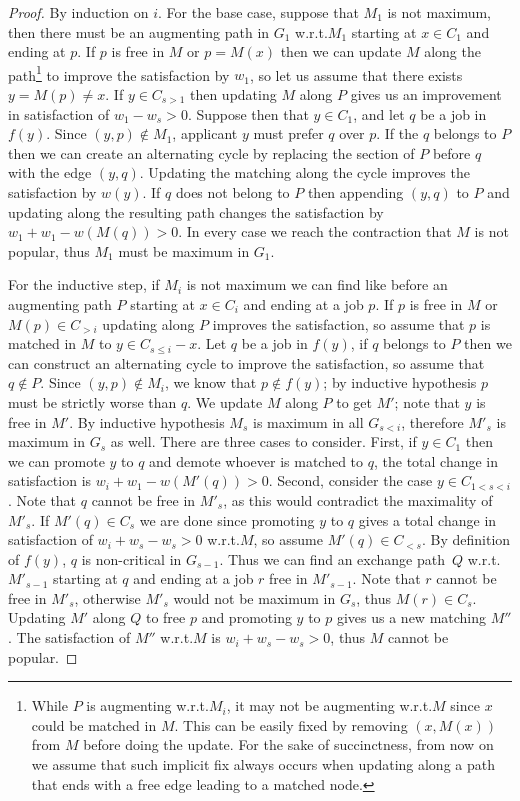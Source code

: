 \documentclass[11pt]{article}
\newcommand{\first}{f}
\newcommand{\wrt}{{w.r.t.}\xspace}
\begin{document}
\begin{proof} 
By induction on $i$. For the base case, suppose that $M_1$ is not maximum, then there must be an augmenting path in $G_1$ \wrt $M_1$ starting at $x \in C_1$ and ending at $p$. If $p$ is free in $M$ or $p = M(x)$ then we can update $M$ along the path\footnote{While $P$ is augmenting \wrt $M_i$, it may not be augmenting \wrt $M$ since $x$ could be matched in $M$. This can be easily fixed by removing $(x,M(x))$ from $M$ before doing the update. For the sake of succinctness, from now on we assume that such implicit fix always occurs when updating along a path that ends with a free edge leading to a matched node.} to improve the satisfaction by $w_1$, so let us assume that there exists $y = M(p) \neq x$. If $y \in C_{s>1}$ then updating $M$ along $P$ gives us an improvement in satisfaction of $w_1 - w_s > 0$. Suppose then that $y \in C_1$, and let $q$ be a job in $\first(y)$. Since $(y,p) \notin M_1$, applicant $y$ must prefer $q$ over $p$. If the $q$ belongs to $P$ then we can create an alternating cycle by replacing the section of $P$ before $q$ with the edge $(y,q)$. Updating the matching along the cycle improves the satisfaction by $w(y)$. If $q$ does not belong to $P$ then appending $(y,q)$ to $P$ and updating along the resulting path changes the satisfaction by $w_1+w_1 - w(M(q)) > 0$. In every case we reach the contraction that $M$ is not popular, thus $M_1$ must be maximum in $G_1$.

For the inductive step, if $M_i$ is not maximum we can find like before an augmenting path $P$ starting at $x \in C_i$ and ending at a job $p$. If $p$ is free in $M$ or $M(p) \in C_{>i}$ updating along $P$ improves the satisfaction, so assume that $p$ is matched in $M$ to $y \in C_{s \leq i} -x$. Let $q$ be a job in $\first(y)$, if $q$ belongs to $P$ then we can construct an alternating cycle to improve the satisfaction, so assume that $q \notin P$. Since $(y,p) \notin M_i$, we know that $p \notin f(y)$; by inductive hypothesis $p$ must be strictly worse than $q$. We update $M$ along $P$ to get $M'$; note that $y$ is free in $M'$. By inductive hypothesis $M_s$ is maximum in all $G_{s<i}$, therefore $M'_s$ is maximum in $G_{s}$ as well. There are three cases to consider. First, if $y \in C_1$ then we can promote $y$ to $q$ and demote whoever is matched to $q$, the total change in satisfaction is $w_i + w_1 - w(M'(q)) > 0$. Second, consider the case $y \in C_{1<s<i}$. Note that $q$ cannot be free in $M'_s$, as this would contradict the maximality of $M'_s$. If $M'(q) \in C_s$ we are done since promoting $y$ to $q$ gives a total change in satisfaction of $w_i + w_s - w_s > 0$  \wrt $M$, so assume $M'(q) \in C_{<s}$. By definition of $\first(y)$, $q$ is non-critical in $G_{s-1}$. Thus we can find an exchange path~$Q$ \wrt $M'_{s-1}$ starting at $q$ and ending at a job $r$ free in $M'_{s-1}$. Note that $r$ cannot be free in $M'_s$, otherwise $M'_s$ would not be maximum in $G_s$, thus $M(r) \in C_s$. Updating $M'$ along $Q$ to free $p$ and promoting $y$ to $p$ gives us a new matching $M''$. The satisfaction of $M''$ \wrt $M$ is $w_i + w_s - w_s > 0$, thus $M$ cannot be popular.


\end{proof}
\end{document}
